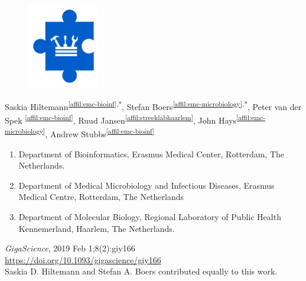 \cleartorightpage
\setcounter{NAT@ctr}{-1}
\chapter*{}\label{chapter:gmt}

\begin{figure}[t!]
\centering
\includegraphics[height=10em]{frontmatter/images/chapter-header-tools.png}
\end{figure}
\vspace{-4cm}

Saskia Hiltemann\textsuperscript{\ref{affil:emc-bioinf},*},
Stefan Boers\textsuperscript{\ref{affil:emc-microbiology},*},
Peter van der Spek \textsuperscript{\ref{affil:emc-bioinf}},
Ruud Jansen\textsuperscript{\ref{affil:streeklabhaarlem}},
John Hays\textsuperscript{\ref{affil:emc-microbiology}},
Andrew Stubbs\textsuperscript{\ref{affil:emc-bioinf}}

\small
\begin{enumerate}
\itemsep-0.5em
\item Department of Bioinformatics, Erasmus Medical Center, Rotterdam, The Netherlands.\label{affil:emc-bioinf}
\item Department of Medical Microbiology and Infectious Diseases, Erasmus Medical Centre, Rotterdam, The Netherlands\label{affil:emc-microbiology}
\item Department of Molecular Biology, Regional Laboratory of Public Health Kennemerland, Haarlem, The Netherlands.\label{affil:streeklabhaarlem}
\end{enumerate}

{\color{chaptergrey}{Published in:}} \emph{GigaScience}, 2019 Feb 1;8(2):giy166 \\
{\color{chaptergrey}{DOI:}} \url{https://doi.org/10.1093/gigascience/giy166} \\
{\color{chaptergrey}{*:}} Saskia D. Hiltemann and Stefan A. Boers contributed equally to this work.



